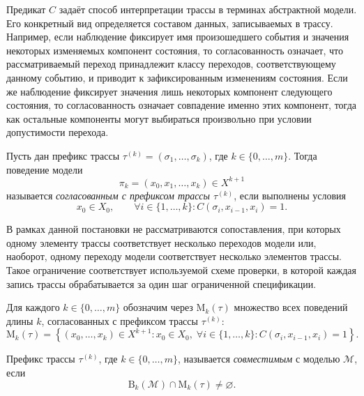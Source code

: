 Предикат $C$ задаёт способ интерпретации трассы в терминах абстрактной модели.
Его конкретный вид определяется составом данных, записываемых в трассу.
Например, если наблюдение фиксирует имя произошедшего события и значения
некоторых изменяемых компонент состояния, то согласованность означает, что
рассматриваемый переход принадлежит классу переходов, соответствующему данному
событию, и приводит к зафиксированным изменениям состояния. Если же наблюдение
фиксирует значения лишь некоторых компонент следующего состояния, то
согласованность означает совпадение именно этих компонент, тогда как остальные
компоненты могут выбираться произвольно при условии допустимости перехода.

\begin{definition}
Пусть дан префикс трассы $\tau^{(k)} = (\sigma_1,\dots,\sigma_k)$, где
$k \in \{0,\dots,m\}$. Тогда поведение модели
\[
\pi_k = (x_0,x_1,\dots,x_k) \in X^{k+1}
\]
называется \emph{согласованным с префиксом трассы $\tau^{(k)}$}, если
выполнены условия
\[
x_0 \in X_0,
\qquad
\forall i \in \{1,\dots,k\} : C(\sigma_i,x_{i-1},x_i)=1.
\]
\end{definition}

В рамках данной постановки не рассматриваются сопоставления, при которых одному
элементу трассы соответствует несколько переходов модели или, наоборот, одному
переходу модели соответствует несколько элементов трассы. Такое ограничение
соответствует используемой схеме проверки, в которой каждая запись трассы
обрабатывается за один шаг ограниченной спецификации.

\begin{definition}
Для каждого $k \in \{0,\dots,m\}$ обозначим через $\mathrm{M}_k(\tau)$
множество всех поведений длины $k$, согласованных с префиксом трассы
$\tau^{(k)}$:
\begin{equation}\label{f8}
\mathrm{M}_k(\tau)
=
\left\{
(x_0,\dots,x_k) \in X^{k+1}
:
x_0 \in X_0,\;
\forall i \in \{1,\dots,k\} : C(\sigma_i,x_{i-1},x_i)=1
\right\}.
\end{equation}
\end{definition}

\begin{definition}
Префикс трассы $\tau^{(k)}$, где $k \in \{0,\dots,m\}$, называется
\emph{совместимым} с моделью $\mathcal{M}$, если
\begin{equation}\label{f8a}
\mathrm{B}_k(\mathcal{M}) \cap \mathrm{M}_k(\tau) \neq \varnothing.
\end{equation}
\end{definition}

